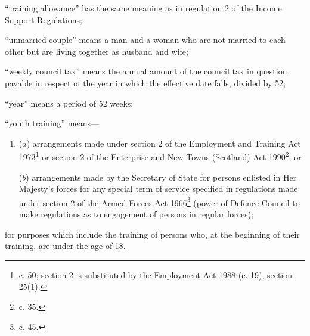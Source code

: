 \documentclass[a4paper]{article}
\begin{document}
\begin{enumerate}

“training allowance” has the same meaning as in regulation 2 of the Income Support Regulations;

“unmarried couple” means a man and a woman who are not married to each other but are living together as husband and wife;

“weekly council tax” means the annual amount of the council tax in question payable in respect of the year in which the effective date falls, divided by 52;

“year” means a period of 52 weeks;

“youth training” means—
\begin{enumerate}\item[]
($a$)
arrangements made under section 2 of the Employment and Training Act 1973\footnote{ c. 50; section 2 is substituted by the Employment Act 1988 (c. 19), section 25(1).} or section 2 of the Enterprise and New Towns (Scotland) Act 1990\footnote{ c. 35.}; or

($b$)
arrangements made by the Secretary of State for persons enlisted in Her Majesty’s forces for any special term of service specified in regulations made under section 2 of the Armed Forces Act 1966\footnote{ c. 45.} (power of Defence Council to make regulations as to engagement of persons in regular forces);
\end{enumerate}

for purposes which include the training of persons who, at the beginning of their training, are under the age of 18.
\end{enumerate}
\end{document}
